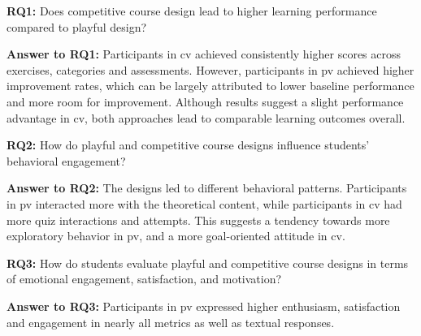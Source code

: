 







\textbf{RQ1:} Does competitive course design lead to higher learning performance compared to playful design?

\textbf{Answer to RQ1:} Participants in \ac{cv} achieved consistently higher scores across exercises, categories and assessments. However, participants in \ac{pv} achieved higher improvement rates, which can be largely attributed to lower baseline performance and more room for improvement. Although results suggest a slight performance advantage in \ac{cv}, both approaches lead to comparable learning outcomes overall.

\textbf{RQ2:} How do playful and competitive course designs influence students’ behavioral engagement?

\textbf{Answer to RQ2:} The designs led to different behavioral patterns. Participants in \ac{pv} interacted more with the theoretical content, while participants in \ac{cv} had more quiz interactions and attempts. This suggests a tendency towards more exploratory behavior in \ac{pv}, and a more goal-oriented attitude in \ac{cv}.

\textbf{RQ3:} How do students evaluate playful and competitive course designs in terms of emotional engagement, satisfaction, and motivation?

\textbf{Answer to RQ3:} Participants in \ac{pv} expressed higher enthusiasm, satisfaction and engagement in nearly all metrics as well as textual responses.

